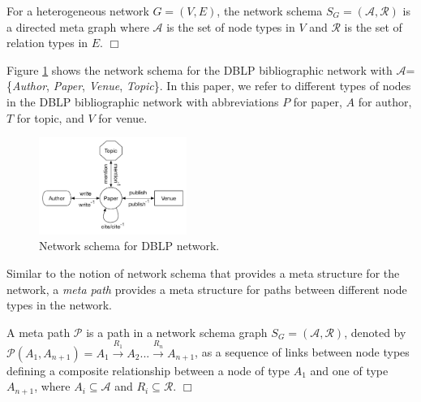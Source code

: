 \begin{definition}For a heterogeneous network $G=(V,E)$, the network schema $S_G=\mathcal{(A,R)}$ is a directed meta graph where $\mathcal{A}$ is the set of node types in $V$ and $\mathcal{R}$ is the set of relation types in $E$.  $\Box$\end{definition}

Figure \ref{schema} shows the network schema for the DBLP bibliographic network with $\mathcal{A}$=\{\textit{Author}, \textit{Paper}, \textit{Venue}, \textit{Topic}\}. In this paper, we refer to different types of nodes in the DBLP bibliographic network with abbreviations $P$ for paper, $A$ for author, $T$ for topic, and $V$ for venue. 

\begin{figure}[t]
\centering
\includegraphics[trim = 0mm 10mm 0mm 0mm,width=0.43\textwidth]{figs/schema.pdf}
\caption{Network schema for DBLP network.}\label{schema}
\end{figure}


Similar to the notion of network schema that provides a meta structure for the network, a \textit{meta path} \cite{sun2011pathsim} provides a meta structure for paths between different node types in the network. 

\begin{definition}A meta path $\mathcal{P}$ is a path in a network schema graph $S_G = (\mathcal{A,R})$, denoted by $\mathcal{P}(A_1,A_{n+1}) = A_1 \xrightarrow{R_1} A_2... \xrightarrow{R_n} A_{n+1}$, as a sequence of links between node types defining a composite relationship between a node of type $A_1$ and one of type $A_{n+1}$, where $A_i \subseteq \mathcal{A}$ and $R_i \subseteq \mathcal{R}$. $\Box$\end{definition}

